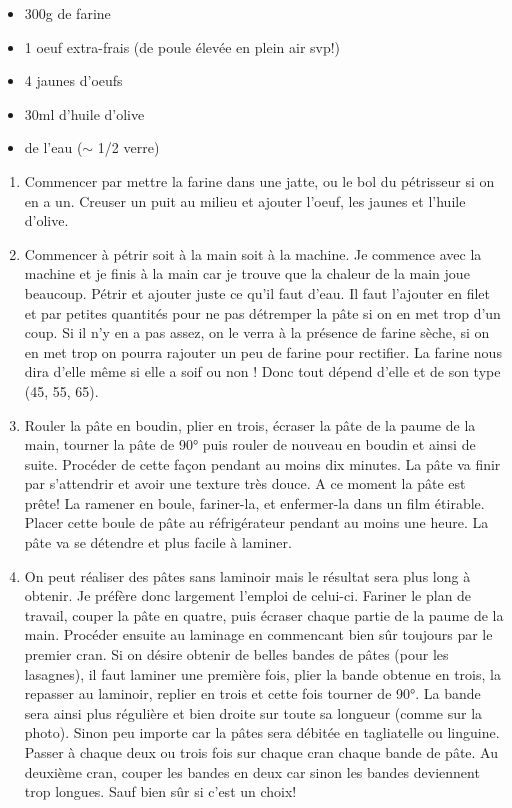 {}{\begin{itemize}
	\item 300g de farine
	\item 1 oeuf extra-frais (de poule élevée en plein air svp!)
	\item 4 jaunes d'oeufs
	\item 30ml d'huile d'olive
	\item de l'eau ($\sim$ 1/2 verre)
\end{itemize}}{\begin{enumerate}
	\item Commencer par mettre la farine dans une jatte, ou le bol du pétrisseur si on en a un. Creuser un puit au milieu et ajouter l'oeuf, les jaunes et l'huile d'olive.
	\item Commencer à pétrir soit à la main soit à la machine. Je commence avec la machine et je finis à la main car je trouve que la chaleur de la main joue beaucoup. Pétrir et ajouter juste ce qu'il faut d'eau. Il faut l'ajouter en filet et par petites quantités pour ne pas détremper la pâte si on en met trop d'un coup. Si il n'y en a pas assez, on le verra à la présence de farine sèche, si on en met trop on pourra rajouter un peu de farine pour rectifier. La farine nous dira d'elle même si elle a soif ou non ! Donc tout dépend d'elle et de son type (45, 55, 65).
	\item Rouler la pâte en boudin, plier en trois, écraser la pâte de la paume de la main, tourner la pâte de 90° puis rouler de nouveau en boudin et ainsi de suite. Procéder de cette façon pendant au moins dix minutes. La pâte va finir par s'attendrir et avoir une texture très douce. A ce moment la pâte est prête! La ramener en boule, fariner-la, et enfermer-la dans un film étirable. Placer cette boule de pâte au réfrigérateur pendant au moins une heure. La pâte va se détendre et plus facile à laminer.
	\item On peut réaliser des pâtes sans laminoir mais le résultat sera plus long à obtenir. Je préfère donc largement l'emploi de celui-ci. Fariner le plan de travail, couper la pâte en quatre, puis écraser chaque partie de la paume de la main. Procéder ensuite au laminage en commencant bien sûr toujours par le premier cran. Si on désire obtenir de belles bandes de pâtes (pour les lasagnes), il faut laminer une première fois, plier la bande obtenue en trois, la repasser au laminoir, replier en trois et cette fois tourner de 90°. La bande sera ainsi plus régulière et bien droite sur toute sa longueur (comme sur la photo). Sinon peu importe car la pâtes sera débitée en tagliatelle ou linguine. Passer à chaque deux ou trois fois sur chaque cran chaque bande de pâte. Au deuxième cran, couper les bandes en deux car sinon les bandes deviennent trop longues. Sauf bien sûr si c'est un choix!

\end{enumerate}}
